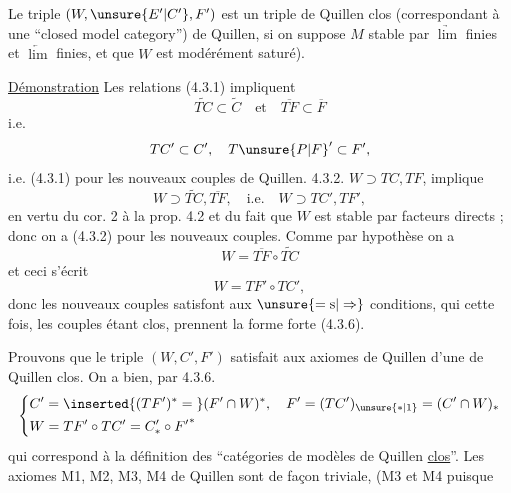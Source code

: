 Le triple $(W,\unsure{E'|C'},F')$ est un triple de Quillen clos
(correspondant à une ``closed model category'') de
Quillen,  si on suppose $M$ stable par $\underrightarrow{\lim}$ finies et
$\underleftarrow{\lim}$ finies, et que $W$  est modérément saturé).


\uline{Démonstration} Les relations (4.3.1) impliquent
\[
\widetilde{TC}\subset\widetilde C\quad\text{et}\quad\overline{TF}\subset\overline F
\]
i.e.
\[
TC'\subset C',\quad T\unsure{P|F}'\subset F',
\]
i.e. (4.3.1) pour les nouveaux couples de
Quillen.  4.3.2. $W\supset TC,TF$, implique
\[
W\supset\widetilde{TC},\overline{TF},\quad\text{i.e.}\quad W\supset TC',TF',
\]
 en vertu du cor. 2 à la prop. 4.2 et du
fait que $W$ est stable par facteurs directs ;
 donc on a (4.3.2) pour les nouveaux
couples. Comme par hypothèse on a
\[
W=\overline{TF}\circ\widetilde{TC}
\]
et ceci s'écrit
\[
W=TF'\circ TC',
\]
donc les nouveaux couples satisfont aux $\unsure{=\mathrm{s}|\Rightarrow}$ conditions,
qui cette fois, les couples étant clos, prennent
la forme forte (4.3.6).

Prouvons que le triple $(W,C',F')$ satisfait
aux axiomes de Quillen d'une   de
Quillen clos. On a bien, par 4.3.6.
\[
\left\{\begin{aligned}
&C'=\inserted{(TF')^*={}}(F'\cap W)^*,\quad F'=(TC')_{\unsure{*|1}}=(C'\cap W)_*\\
&W=TF'\circ TC'=C'_*\circ {F'}^{*}
\end{aligned}\right.
\]
qui correspond à la définition des ``catégories de
modèles de Quillen \uline{clos}''. Les axiomes
M1,  M2, M3, M4 de Quillen sont 
de façon triviale,  (M3 et M4 puisque

